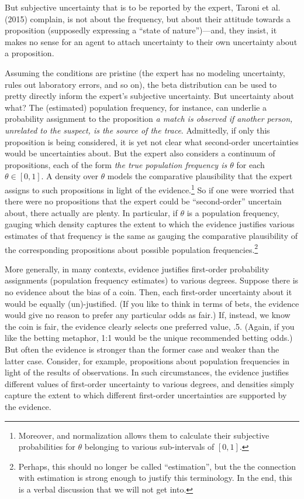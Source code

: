 \documentclass[
  10pt,
  dvipsnames,enabledeprecatedfontcommands]{scrartcl}
\begin{document}
But subjective uncertainty that is to be reported by the expert, Taroni
et al. (2015) complain, is not about the frequency, but about their
attitude towards a proposition (supposedly expressing a ``state of
nature'')---and, they insist, it makes no sense for an agent to attach
uncertainty to their own uncertainty about a proposition.

Assuming the conditions are pristine (the expert has no modeling
uncertainty, rules out laboratory errors, and so on), the beta
distribution can be used to pretty directly inform the expert's
subjective uncertainty. But uncertainty about what? The (estimated)
population frequency, for instance, can underlie a probability
assignment to the proposition
\emph{a match is observed  if another person, unrelated to the suspect, is the source of the trace}.
Admittedly, if only this proposition is being considered, it is yet not
clear what second-order uncertainties would be uncertainties about. But
the expert also considers a continuum of propositions, each of the form
\emph{the true population frequency is $\theta$} for each
\(\theta\in [0,1]\). A density over \(\theta\) models the comparative
plausibility that the expert assigns to such propositions in light of
the
evidence.\footnote{Moreover, and normalization allows them to calculate their subjective probabilities for $\theta$ belonging to various sub-intervals of $[0,1]$.}
So if one were worried that there were no propositions that the expert
could be ``second-order'' uncertain about, there actually are plenty.
In particular, if \(\theta\) is a population frequency, gauging which
density captures the extent to which the evidence justifies various
estimates of that frequency is the same as gauging the comparative
plausibility of the corresponding propositions about possible population
frequencies.\footnote{Perhaps, this should no longer be called
  ``estimation'', but the the connection with estimation is strong
  enough to justify this terminology. In the end, this is a verbal
  discussion that we will not get into.}

More generally, in many contexts, evidence justifies first-order
probability assignments (population frequency estimates) to various
degrees. Suppose there is no evidence about the bias of a coin. Then,
each first-order uncertainty about it would be equally (un)-justified.
(If you like to think in terms of bets, the evidence would give no
reason to prefer any particular odds as fair.) If, instead, we know the
coin is fair, the evidence clearly selects one preferred value, .5.
(Again, if you like the betting metaphor, 1:1 would be the unique
recommended betting odds.) But often the evidence is stronger than the
former case and weaker than the latter case. Consider, for example,
propositions about population frequencies in light of the results of
observations. In such circumstances, the evidence justifies different
values of first-order uncertainty to various degrees, and densities
simply capture the extent to which different first-order uncertainties
are supported by the evidence.
\end{document}
